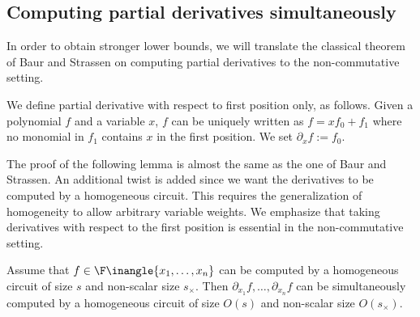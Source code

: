 \documentclass[11pt]{article}
\begin{document}
\subsection{Computing partial derivatives simultaneously}\label{sec:nd}

In order to obtain stronger lower bounds, we will translate the 
classical theorem of Baur and Strassen \cite{BS83} on computing partial derivatives to the non-commutative setting. 

We define partial derivative with respect to first position only, as follows. Given a polynomial $f$ and a variable $x$, $f$ can be uniquely written as $f=xf_0+f_1$ where no monomial in $f_1$ contains $x$ in the first position. 
We set $\partial_xf := f_0$. 

The proof of the following lemma is almost the same as the one of Baur and Strassen. An additional twist is added since we want the derivatives to be computed by a homogeneous circuit. 
This requires the generalization of homogeneity to allow arbitrary variable weights.
We emphasize that taking derivatives with respect to the first position is essential in the non-commutative setting. 

  
\begin{lemma}\label{lem:computing-partials-simultaneously}
  Assume that $f \in \F\inangle{x_1, \ldots, x_n}$ can be computed by a homogeneous circuit of size $s$ and non-scalar size $s_{\times}$. 
  Then $\partial_{ x_1}f, \ldots, \partial_{x_n}f$ can be simultaneously computed by a homogeneous circuit of size $O(s)$ and non-scalar size $O(s_\times)$.
\end{lemma}
\end{document}
